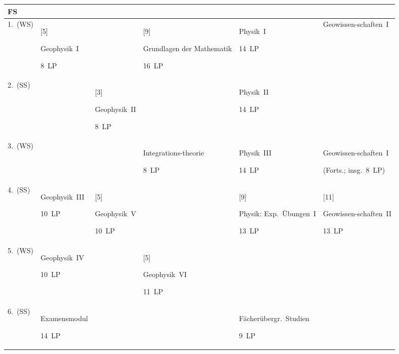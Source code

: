 \begin{table*}[hb]
\let\fibnl\par
\setlength{\temp}{0.156\textwidth}
\renewcommand{\multirowsetup}{\centering}

\centering
\begin{tabular}
{| p{} | *{5}{>{\centering\arraybackslash}m{\temp}|}}
\hline
\textbf{FS} & \multicolumn{5}{c|}{\textbf{Module}}
\\ \hline
1.\ (WS)\vspace{\baselineskip} &
	\multirow{2}[5]{\temp}{Geophysik~I\fibnl\footnotesize
	\SI{8}{LP}} &
	&
	\multirow{2}[9]{\temp}{Grundlagen der Mathematik\fibnl\footnotesize\SI{16}{LP}} &
	Physik~I\fibnl\footnotesize\SI{14}{LP} &
	Geowissen-schaften~I
\\ \cline{1-1}\cline{3-3}\cline{5-6}
2.\ (SS)\vspace{\baselineskip} &
	&
	\multirow{2}[3]{\temp}{Geophysik~II\fibnl\footnotesize
	\SI{8}{LP}} &
	&
	Physik~II\fibnl\footnotesize\SI{14}{LP} &
\\ \cline{1-2}\cline{4-6}
3.\ (WS) &
	&
	&
	Integrations-theorie\fibnl\footnotesize\SI{8}{LP} &
	Physik~III\fibnl\footnotesize\SI{14}{LP} &
	Geowissen-schaften~I\fibnl\footnotesize(Forts.; insg.\ \SI{8}{LP})
\\ \hline
4.\ (SS)\vspace{\baselineskip} &
	Geophysik~III\fibnl\footnotesize
	\SI{10}{LP} &
	\multirow{2}[5]{\temp}{Geophysik~V\fibnl\footnotesize
	\SI{10}{LP}} &
	&
	\multirow{2}[9]{\temp}{Physik: Exp.\ Übungen~I\fibnl\footnotesize\SI{13}{LP}} &
	\multirow{2}[11]{\temp}{Geowissen-schaften~II\fibnl\footnotesize\SI{13}{LP}}
\\ \cline{1-2}\cline{4-4}
5.\ (WS)\vspace{\baselineskip} &
	Geophysik~IV\fibnl\footnotesize
	\SI{10}{LP} &
	&
	\multirow{2}[5]{\temp}{Geophysik~VI\fibnl\footnotesize
	\SI{11}{LP}} &
	&
\\ \cline{1-3}\cline{5-6}
6.\ (SS) &
	Examensmodul\fibnl\footnotesize\SI{14}{LP} &
	&
	&
	Fächerübergr.\ Studien\fibnl\footnotesize\SI{9}{LP} &
\\ \hline
\end{tabular}
\end{table*}

